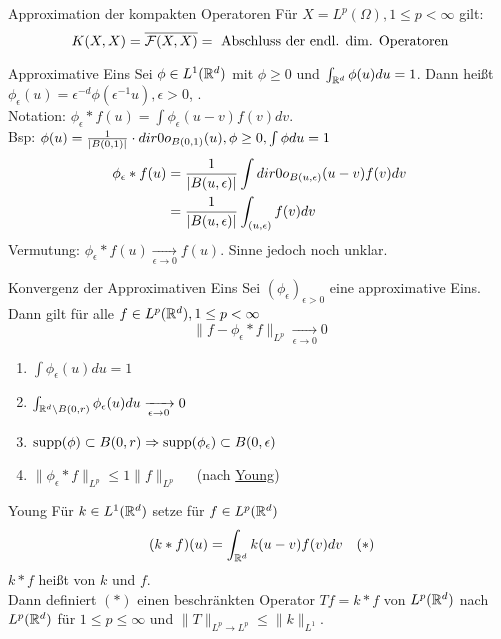 	\begin{karte}{Approximation der kompakten Operatoren}
			Für $X = L^{p}(\Omega), 1 \leq p < \infty$ gilt:
		\[ K(X, X) = \overline{\mathcal{F}(X, X)} = \text{ Abschluss der endl. dim. Operatoren} \]	
	\end{karte}

	\begin{karte}{Approximative Eins}
		Sei $\phi \in L^{1}(\mathbb{R}^{d})$ mit $\phi \geq 0$ und $\int_{\mathbb{R}^{d}} \phi(u) du = 1$. Dann hei{\ss}t $\phi_{\epsilon}(u) = \epsilon^{-d} \phi(\epsilon^{-1} u), \epsilon > 0$,	. \\
		Notation: $\phi_{\epsilon} \ast f(u) = \int \phi_{\epsilon}(u - v) f(v) dv$. \\
		Bsp: $\phi(u) = \frac{1}{|B(0, 1)|} \cdot \1_{B(0, 1)}(u), \phi \geq 0, \int \phi du = 1	$ \\
	\begin{align*}
		\phi_{\epsilon} \ast f(u) & = \frac{1}{|B(u, \epsilon)|} \int \1_{B(u, \epsilon)}(u - v) f(v) dv \\
		&  = \frac{1}{|B(u, \epsilon)|} \int_{(u, \epsilon)} f(v) dv 
	\end{align*}
	Vermutung: $\phi_{\epsilon} \ast f(u) \xrightarrow[\epsilon \rightarrow 0]{} f(u)$.  Sinne jedoch noch unklar.		

	\end{karte}
	
	\begin{karte}{Konvergenz der Approximativen Eins}
		Sei $(\phi_{\epsilon})_{\epsilon > 0}$ eine approximative Eins. Dann gilt für alle $f \in L^{p}(\mathbb{R}^{d}), 1 \leq p < \infty$
		\[ \| f - \phi_{\epsilon} \ast f \|_{L^{p}} \xrightarrow[\epsilon \rightarrow 0]{} 0 \]
			\begin{enumerate}[label=\roman*\upshape)]
		\item $\int \phi_{\epsilon}(u) du = 1$
		\item $\int_{\mathbb{R}^{d} \setminus B(0, r)} \phi_{\epsilon}(u) du \xrightarrow[\epsilon \rightarrow 0]{} 0$
		\item $\operatorname{supp}(\phi) \subset B(0, r) \Rightarrow \operatorname{supp}(\phi_{\epsilon}) \subset B(0, \epsilon)$
		\item $\| \phi_{\epsilon} \ast f \|_{L^{p}} \leq 1 \| f \|_{L^{p}} \quad$ (nach \hyperref[satz:8.5-Young]{Young})
	\end{enumerate}	
	\end{karte}

	\begin{karte}{Young}
		Für $k \in L^{1}(\mathbb{R}^{d})$ setze für $f \in L^{p}(\mathbb{R}^{d})$
		\[ (k \ast f) (u) = \int_{\MdR^{d}} k(u - v) f(v) dv \quad (*) \label{eq:8.5-Young} \]
		$k \ast f$ hei{\ss}t  von $k$ und $f$. \\
		Dann definiert \hyperref[eq:8.5-Young]{$(*)$} einen beschränkten Operator $T f = k \ast f$ von $L^{p}(\mathbb{R}^{d})$ nach $L^{p}(\mathbb{R}^{d})$ für $1 \leq p \leq \infty$ und $\|T\|_{L^{p} \rightarrow L^{p}} \leq \|k\|_{L^{1}}$.
	\end{karte}
	
